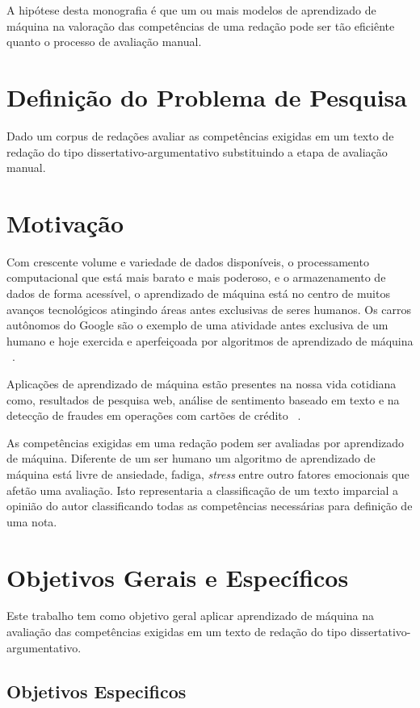 A hipótese desta monografia é que um ou mais modelos de aprendizado de máquina na valoração das competências de uma redação pode ser tão eficiênte quanto o processo de avaliação manual.

\section{Definição do Problema de Pesquisa}

Dado um corpus de redações avaliar as competências exigidas em um texto de redação do tipo dissertativo-argumentativo substituindo a etapa de avaliação manual.

\section{Motivação}

Com crescente volume e variedade de dados disponíveis, o processamento computacional que está mais barato e mais poderoso, e o armazenamento de dados de forma acessível, o aprendizado de máquina está no centro de muitos avanços tecnológicos atingindo áreas antes exclusivas de seres humanos. Os carros autônomos do Google são o exemplo de uma atividade antes exclusiva de um humano e hoje exercida e aperfeiçoada por algoritmos de aprendizado de máquina ~\cite{waymo:2017}.

Aplicações de aprendizado de máquina estão presentes na nossa vida cotidiana como, resultados de pesquisa web, análise de sentimento baseado em texto e na detecção de fraudes em operações com cartões de crédito ~\cite{batista1999aplicando}.

As competências exigidas em uma redação podem ser avaliadas por aprendizado de máquina. Diferente de um ser humano um algoritmo de aprendizado de máquina está livre de ansiedade, fadiga, \textit{stress} entre outro fatores emocionais que afetão uma avaliação. Isto representaria a classificação de um texto imparcial a opinião do autor classificando todas as competências necessárias para definição de uma nota.

\section{Objetivos Gerais e Específicos}

Este trabalho tem como objetivo geral aplicar aprendizado de máquina na avaliação das competências exigidas em um texto de redação do tipo dissertativo-argumentativo.

\subsection{Objetivos Especificos}

